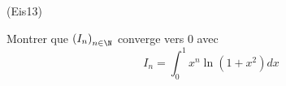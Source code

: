 \begin{tiny}(Eis13)\end{tiny} Montrer que $\left( I_n\right) _{n\in \N}$ converge vers $0$ avec
\begin{displaymath}
 I_n = \int_0^1x^n\ln(1+x^2)dx
\end{displaymath}
